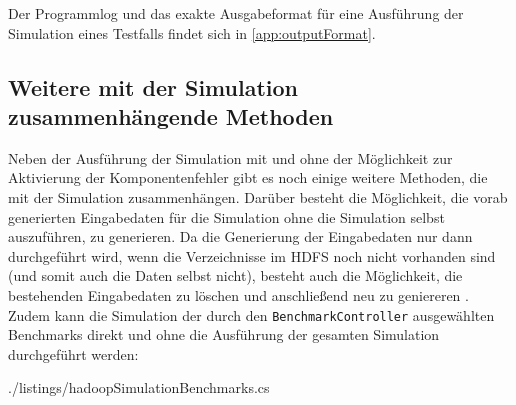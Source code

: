 Der Programmlog und das exakte Ausgabeformat für eine Ausführung der Simulation eines Testfalls findet sich in \autoref{app:outputFormat}.

\subsection{Weitere mit der Simulation zusammenhängende Methoden}
\label{sec:simulationUtilities}

Neben der Ausführung der Simulation mit und ohne der Möglichkeit zur Aktivierung der Komponentenfehler gibt es noch einige weitere Methoden, die mit der Simulation zusammenhängen.
Darüber besteht die Möglichkeit, die vorab generierten Eingabedaten für die Simulation ohne die Simulation selbst auszuführen, zu generieren.
Da die Generierung der Eingabedaten nur dann durchgeführt wird, wenn die Verzeichnisse im \ac{HDFS} noch nicht vorhanden sind (und somit auch die Daten selbst nicht), besteht auch die Möglichkeit, die bestehenden Eingabedaten zu löschen und anschließend neu zu geniereren .
Zudem kann die Simulation der durch den \texttt{BenchmarkController} ausgewählten Benchmarks direkt und ohne die Ausführung der gesamten Simulation durchgeführt werden:


{./listings/hadoopSimulationBenchmarks.cs}
